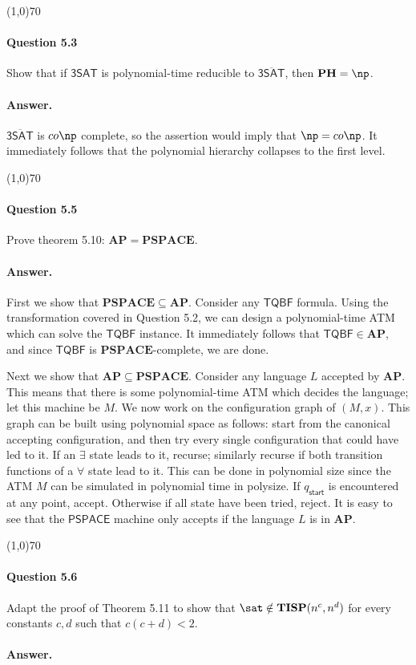 \begin{center}
	\line(1,0){70}
\end{center}

\paragraph{Question 5.3} Show that if $\mathsf{3SAT}$ is polynomial-time reducible to $\overline{\mathsf{3SAT}}$, then $\mathbf{PH}=\np$.

\paragraph{Answer.} $\overline{\mathsf{3SAT}}$ is $co\np$ complete, so the assertion would imply that $\np=co\np$. It immediately follows that the polynomial hierarchy collapses to the first level.

\begin{center}
	\line(1,0){70}
\end{center}

\paragraph{Question 5.5} Prove theorem 5.10: $\mathbf{AP}=\mathbf{PSPACE}$.

\paragraph{Answer.} First we show that $\mathbf{PSPACE}\subseteq\mathbf{AP}$. Consider any $\mathsf{TQBF}$ formula. Using the transformation covered in Question 5.2, we can design a polynomial-time ATM which can solve the $\mathsf{TQBF}$ instance. It immediately follows that $\mathsf{TQBF}\in\mathbf{AP}$, and since $\mathsf{TQBF}$ is $\mathbf{PSPACE}$-complete, we are done.

Next we show that $\mathbf{AP}\subseteq\mathbf{PSPACE}$. Consider any language $L$ accepted by $\mathbf{AP}$. This means that there is some polynomial-time ATM which decides the language; let this machine be $M$. We now work on the configuration graph of $(M,x)$. This graph can be built using polynomial space as follows: start from the canonical accepting configuration, and then try every single configuration that could have led to it. If an $\exists$ state leads to it, recurse; similarly recurse if both transition functions of a $\forall$ state lead to it. This can be done in polynomial size since the ATM $M$ can be simulated in polynomial time in polysize. If $q_{\mathsf{start}}$ is encountered at any point, accept. Otherwise if all state have been tried, reject. It is easy to see that the $\mathsf{PSPACE}$ machine only accepts if the language $L$ is in $\mathbf{AP}$.

\begin{center}
	\line(1,0){70}
\end{center}

\paragraph{Question 5.6} Adapt the proof of Theorem 5.11 to show that $\sat\notin\mathbf{TISP}(n^c, n^d)$ for every constants
$c, d$ such that $c(c + d) < 2$.

\paragraph{Answer.}
